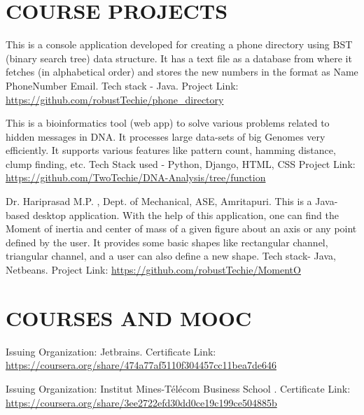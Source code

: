 \documentclass[11pt,a4paper,sans]{moderncv}        %
\begin{document}
\section{COURSE PROJECTS}

{This is a console application developed for creating a phone directory using BST (binary search tree) data structure. It has a text file as a database from where it fetches (in alphabetical order) and stores the new numbers in the format as Name PhoneNumber Email. Tech stack - Java. Project Link:   {\newline}
\url{https://github.com/robustTechie/phone_directory}}{}

{This is a bioinformatics tool (web app) to solve various problems related to hidden messages in DNA. It processes
large data-sets of big Genomes very efficiently. It supports various features like pattern count, hamming distance, clump finding, etc. Tech Stack used - Python, Django, HTML, CSS Project Link:   {\newline}
\url{https://github.com/TwoTechie/DNA-Analysis/tree/function}}{}

{Dr. Hariprasad M.P. , Dept. of Mechanical, ASE, Amritapuri.{\newline}
This is a Java-based desktop application. With the help of this application, one can find the Moment of inertia and
center of mass of a given figure about an axis or any point defined by the user. It provides some basic shapes like rectangular channel, triangular channel, and a user can also define a new shape. Tech stack- Java, Netbeans. Project Link: {\newline}
\url{https://github.com/robustTechie/MomentO}}{}



\section{COURSES AND MOOC}
{Issuing Organization: Jetbrains.{\newline}
Certificate Link:
\url{https://coursera.org/share/474a77af5110f304457cc11bea7de646}}{}

{Issuing Organization: Institut Mines-Télécom Business School .{\newline}
Certificate Link: 
\url{https://coursera.org/share/3ee2722efd30dd0ce19c199ce504885b}}{}
\end{document}

